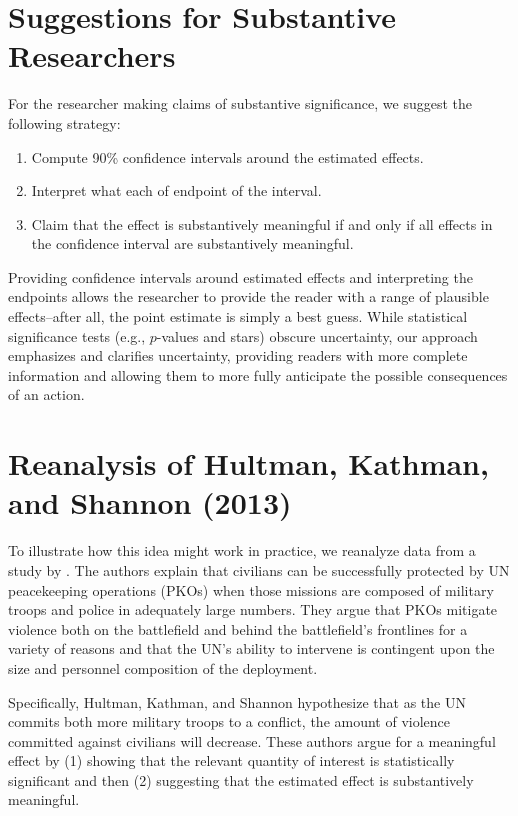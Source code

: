 \documentclass[12pt]{article}
\begin{document}
\section*{Suggestions for Substantive Researchers}
For the researcher making claims of substantive significance, we suggest the following strategy:
\begin{enumerate}
\item Compute 90\% confidence intervals around the estimated effects. 
\item Interpret what each of endpoint of the interval.
\item Claim that the effect is substantively meaningful if and only if all effects in the confidence interval are substantively meaningful.
\end{enumerate}
Providing confidence intervals around estimated effects and interpreting the endpoints allows the researcher to provide the reader with a range of plausible effects--after all, the point estimate is simply a best guess. While statistical significance tests (e.g., $p$-values and stars) obscure uncertainty, our approach emphasizes and clarifies uncertainty, providing readers with more complete information and allowing them to more fully anticipate the possible consequences of an action.

\section*{Reanalysis of Hultman, Kathman, and Shannon (2013)}

To illustrate how this idea might work in practice, we reanalyze data from a study by \cite{HultmanKathmanShannon2013}. The authors explain that civilians can be successfully protected by UN peacekeeping operations (PKOs) when those missions are composed of military troops and police in adequately large numbers. They argue that PKOs mitigate violence both on the battlefield and behind the battlefield's frontlines for a variety of reasons and that the UN's ability to intervene is contingent upon the size and personnel composition of the deployment.

Specifically, Hultman, Kathman, and Shannon hypothesize that as the UN commits both more military troops to a conflict, the amount of violence committed against civilians will decrease. These authors argue for a meaningful effect by (1) showing that the relevant quantity of interest is statistically significant and then (2) suggesting that the estimated effect is substantively meaningful.
\end{document}

